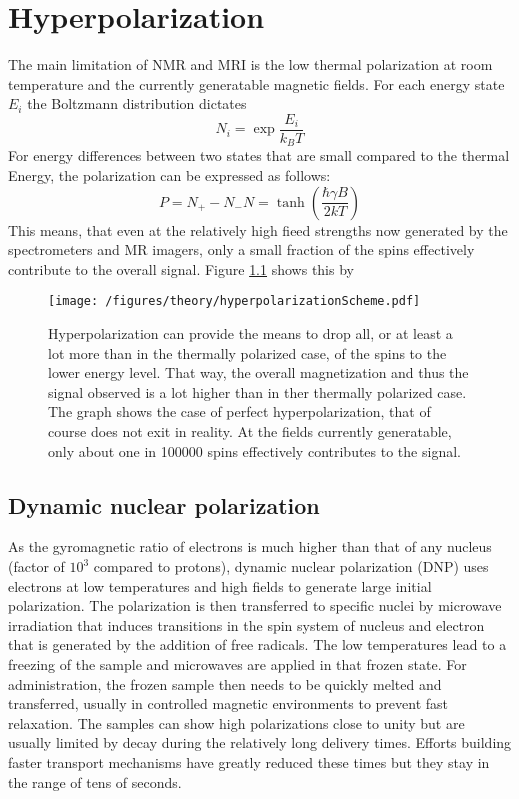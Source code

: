     \section{Hyperpolarization}
    The main limitation of NMR and MRI is the low thermal polarization at room temperature and the currently generatable magnetic fields. For each energy state $E_i$ the Boltzmann distribution dictates
        \begin{equation}
            N_i = \exp{\frac{E_i}{k_B T}}
        \end{equation}
        For energy differences between two states that are small compared to the thermal Energy, the polarization can be expressed as follows:
        \begin{equation}
            P = {N_+-N_-}{N} = \tanh\left(\frac{\hbar \gamma B}{2 k T }\right)
            \label{equation:theory:polarization}
        \end{equation}
        This means, that even at the relatively high fieed strengths now generated by the spectrometers and MR imagers, only a small fraction of the spins effectively contribute to the overall signal. Figure \ref{} shows this by 
        \begin{figure}
            \centering
            \texttt{[image: /figures/theory/hyperpolarizationScheme.pdf]}
            \caption[Hyperpolarization scheme]{Hyperpolarization can provide the means to drop all, or at least a lot more than in the thermally polarized case, of the spins to the lower energy level. That way, the overall magnetization and thus the signal observed is a lot higher than in ther thermally polarized case. The graph shows the case of perfect hyperpolarization, that of course does not exit in reality. At the fields currently generatable, only about one in 100000 spins effectively contributes to the signal.}
        \end{figure}
        \subsection{Dynamic nuclear polarization}
            As the gyromagnetic ratio of electrons is much higher than that of any nucleus (factor of $10^{3}$ compared to protons), dynamic nuclear polarization (DNP) uses electrons at low temperatures and high fields to generate large initial polarization. The polarization is then transferred to specific nuclei by microwave irradiation that induces transitions in the spin system of nucleus and electron that is generated by the addition of free radicals. The low temperatures lead to a freezing of the sample and microwaves are applied in that frozen state. For administration, the frozen sample then needs to be quickly melted and transferred, usually in controlled magnetic environments to prevent fast relaxation. The samples can show high polarizations close to unity but are usually limited by decay during the relatively long delivery times. Efforts building faster transport mechanisms have greatly reduced these times but they stay in the range of tens of seconds.
